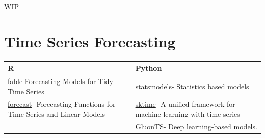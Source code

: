 \documentclass[]{book}
\begin{document}
WIP

\hypertarget{time-series-forecasting}{%
\section{Time Series Forecasting}\label{time-series-forecasting}}

\begin{longtable}[]{@{}ll@{}}
\toprule
\begin{minipage}[b]{0.47\columnwidth}\raggedright
R\strut
\end{minipage} & \begin{minipage}[b]{0.47\columnwidth}\raggedright
Python\strut
\end{minipage}\tabularnewline
\midrule
\endhead
\begin{minipage}[t]{0.47\columnwidth}\raggedright
\href{https://cran.r-project.org/web/packages/fable/index.html}{fable}-Forecasting Models for Tidy Time Series\strut
\end{minipage} & \begin{minipage}[t]{0.47\columnwidth}\raggedright
\href{https://www.statsmodels.org/devel/user-guide.html\#time-series-analysis}{statsmodels}- Statistics based models\strut
\end{minipage}\tabularnewline
\begin{minipage}[t]{0.47\columnwidth}\raggedright
\href{https://cran.r-project.org/web/packages/forecast/index.html}{forecast}- Forecasting Functions for Time Series and Linear Models\strut
\end{minipage} & \begin{minipage}[t]{0.47\columnwidth}\raggedright
\href{https://www.sktime.org/en/latest/}{sktime}- A unified framework for machine learning with time series\strut
\end{minipage}\tabularnewline
\begin{minipage}[t]{0.47\columnwidth}\raggedright
\(\text{}\)\strut
\end{minipage} & \begin{minipage}[t]{0.47\columnwidth}\raggedright
\href{https://ts.gluon.ai/}{GluonTS}- Deep learning-based models.\strut
\end{minipage}\tabularnewline
\bottomrule
\end{longtable}


\end{document}
